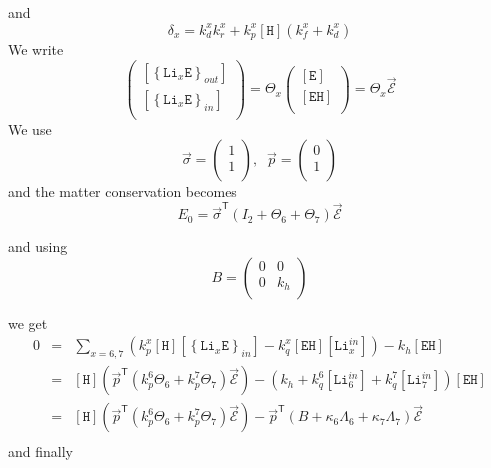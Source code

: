 \documentclass[aps,onecolumn,11pt]{revtex4}
\newcommand{\mychem}[1]{\mathtt{#1}}
\newcommand{\myconc}[1]{\left\lbrack{#1}\right\rbrack}
\newcommand{\LiEin}[1]{\myconc{\left\lbrace\mychem{Li}_{#1}\mychem{E}\right\rbrace_{in}}}
\newcommand{\LiEout}[1]{\myconc{\left\lbrace\mychem{Li}_{#1}\mychem{E}\right\rbrace_{out}}}
\newcommand{\LiIn}[1]{\myconc{\mychem{Li}_{#1}^{in}}}
\newcommand{\EHin}{\myconc{\mychem{EH}}}
\newcommand{\Eout}{\myconc{\mychem{E}}}
\newcommand{\Hin}{\myconc{\mychem{H}}}
\newcommand{\mytrn}[1]{{#1}^{\mathsf{T}}}
\begin{document}
and
\begin{equation}
\delta_x = k_d^x k_r^x + k_p^x \Hin \left(k_f^x+k_d^x\right)
\end{equation}
We write
\begin{equation}
	\begin{pmatrix}
	\LiEout{x}\\
	\LiEin{x}\\
\end{pmatrix}
= 
\Theta_x 
\begin{pmatrix}
	\Eout\\
	\EHin\\
\end{pmatrix}
=\Theta_x \vec{\mathcal{E}}
\end{equation}
We use 
\begin{equation}
	\vec{\sigma} = 
	\begin{pmatrix}
	1\\
	1\\
	\end{pmatrix}, \;\; 
	\vec{p} = 
	\begin{pmatrix}
	0\\
	1\\
	\end{pmatrix}
\end{equation}
and the matter conservation becomes
\begin{equation}
	E_0 = \mytrn{\vec{\sigma}}\left(I_2+\Theta_6+\Theta_7\right) \vec{\mathcal{E}}
\end{equation}

and using
\begin{equation}
	B = 
	\begin{pmatrix}
	0 & 0\\
	0 & k_h\\
	\end{pmatrix}
\end{equation}

we get
\begin{equation}
	\begin{array}{rcl}
		0 & = & \sum_{x=6,7}\left( k_p^x \Hin \LiEin{x} - k_q^x \EHin \LiIn{x}\right) - k_h \EHin\\
		  & = &
			\Hin \left(
			\mytrn{\vec{p}} 
			\left(
			k_p^6\Theta_6 + k_p^7 \Theta_7
			\right)
			\vec{\mathcal{E}}
			\right)
			-\left(k_h + k_q^6 \LiIn{6} + k_q^7 \LiIn{7} \right) \EHin
		  \\
		  & = & \Hin \left(
			\mytrn{\vec{p}} 
			\left(
			k_p^6\Theta_6 + k_p^7 \Theta_7
			\right)
			\vec{\mathcal{E}}
			\right)
			-\mytrn{\vec{p}} \left(B+\kappa_6\Lambda_6+\kappa_7\Lambda_7\right) \vec{\mathcal{E}}
\\
	\end{array}
\end{equation}
and finally
\end{document}
